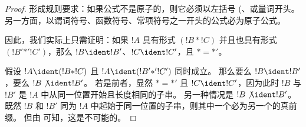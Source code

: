 \documentclass[../../../include/open-logic-section]{subfiles}
\begin{document}
\begin{proof}
形成规则要求：如果公式不是原子的，则它必须以左括号 (、或量词开头。
另一方面，以谓词符号、函数符号、常项符号之一开头的公式必为原子公式。

因此，我们实际上只需证明：如果 $!A$ 具有形式 $(!B \ast !C)$ 并且也具有形式 $(!B' \mathbin{\ast'} !C')$，那么 $!B \ident !B'$、$!C \ident !C'$，且 $\ast = {\ast'}$。

假设 $!A \ident (!B \ast !C)$ 且 $!A \ident (!B'
\mathbin{\ast'} !C')$ 同时成立。
那么要么 $!B \ident !B'$，要么 $!B \not\ident !B'$。
若是前者，显然 $\ast = {\ast'}$ 且 $!C \ident !C'$，因为此时 $!B$ 与 $!B'$ 是 $!A$ 中从同一位置开始且长度相同的子串。
另一种情况是 $!B \not\ident !B'$。
既然 $!B$ 和 $!B'$ 同为 $!A$ 中起始于同一位置的子串，则其中一个必为另一个的真前缀。
但由  可知，这是不可能的。
\end{proof}
\end{document}

